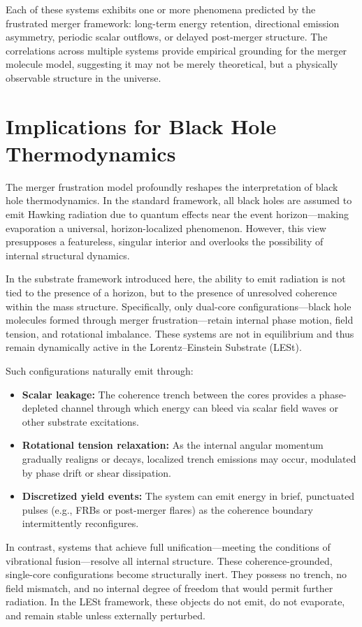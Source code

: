 \documentclass[sn-mathphys]{sn-jnl}
\theoremstyle{thmstyleone}%
\theoremstyle{thmstyletwo}%
\theoremstyle{thmstylethree}%
\begin{document}
Each of these systems exhibits one or more phenomena predicted by the frustrated merger framework: long-term energy retention, directional emission asymmetry, periodic scalar outflows, or delayed post-merger structure. The correlations across multiple systems provide empirical grounding for the merger molecule model, suggesting it may not be merely theoretical, but a physically observable structure in the universe. 


\section{Implications for Black Hole Thermodynamics}

The merger frustration model profoundly reshapes the interpretation of black hole thermodynamics. In the standard framework, all black holes are assumed to emit Hawking radiation due to quantum effects near the event horizon—making evaporation a universal, horizon-localized phenomenon. However, this view presupposes a featureless, singular interior and overlooks the possibility of internal structural dynamics.

In the substrate framework introduced here, the ability to emit radiation is not tied to the presence of a horizon\cite{Unruh1981}, but to the presence of unresolved coherence within the mass structure. Specifically, only dual-core configurations—black hole molecules formed through merger frustration—retain internal phase motion, field tension, and rotational imbalance. These systems are not in equilibrium and thus remain dynamically active in the Lorentz--Einstein Substrate (LESt).

Such configurations naturally emit through:
\begin{itemize}
\item \textbf{Scalar leakage:} The coherence trench between the cores provides a phase-depleted channel through which energy can bleed via scalar field waves or other substrate excitations.
\item \textbf{Rotational tension relaxation:} As the internal angular momentum gradually realigns or decays, localized trench emissions may occur, modulated by phase drift or shear dissipation.
\item \textbf{Discretized yield events:} The system can emit energy in brief, punctuated pulses (e.g., FRBs or post-merger flares) as the coherence boundary intermittently reconfigures.
\end{itemize}

In contrast, systems that achieve full unification—meeting the conditions of vibrational fusion—resolve all internal structure. These coherence-grounded, single-core configurations become structurally inert. They possess no trench, no field mismatch, and no internal degree of freedom that would permit further radiation. In the LESt framework, these objects do not emit, do not evaporate, and remain stable unless externally perturbed.
\end{document}
